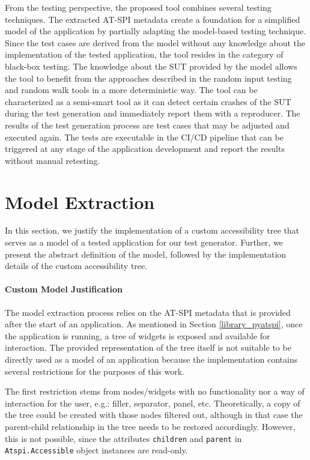 From the testing perspective, the proposed tool combines several testing techniques. The extracted AT-SPI metadata create a foundation for a simplified model of the application by partially adapting the model-based testing technique. Since the test cases are derived from the model without any knowledge about the implementation of the tested application, the tool resides in the category of black-box testing. The knowledge about the SUT provided by the model allows the tool to benefit from the approaches described in the random input testing and random walk tools in a more deterministic way. The tool can be characterized as a semi-smart tool as it can detect certain crashes of the SUT during the test generation and immediately report them with a reproducer. The results of the test generation process are test cases that may be adjusted and executed again. The tests are executable in the CI/CD pipeline that can be triggered at any stage of the application development and report the results without manual retesting.

\section{Model Extraction}\label{model}
 In this section, we justify the implementation of a custom accessibility tree that serves as a model of a tested application for our test generator. Further, we present the abstract definition of the model, followed by the implementation details of the custom accessibility tree.
 
\paragraph{Custom Model Justification} The model extraction process relies on the AT-SPI metadata that is provided after the start of an application. As mentioned in Section \ref{library_pyatspi}, once the application is running, a tree of widgets is exposed and available for interaction. The provided representation of the tree itself is not suitable to be directly used as a model of an application because the implementation contains several restrictions for the purposes of this work.

The first restriction stems from nodes/widgets with no functionality nor a way of interaction for the user, e.g.: filler, separator, panel, etc. Theoretically, a copy of the tree could be created with those nodes filtered out, although in that case the parent-child relationship in the tree needs to be restored accordingly. However, this is not possible, since the attributes \texttt{children} and \texttt{parent} in \texttt{Atspi.Accessible} object instances are read-only. 


